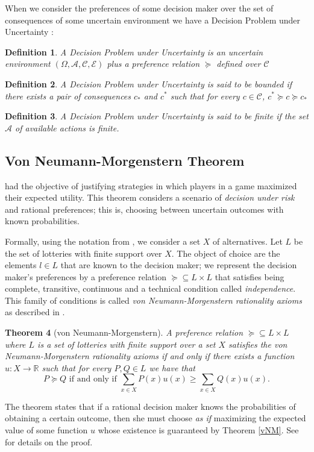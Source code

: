 \documentclass[review]{elsarticle}
\newtheorem{theorem}{Theorem}
\newtheorem{definition}[theorem]{Definition}
\begin{document}
When we consider the preferences of some decision maker over the set of consequences of some uncertain environment we have a Decision Problem under Uncertainty \citep{bernardo2000bayesian}:

\begin{definition}
A Decision Problem under Uncertainty is an uncertain environment $(\Omega, \mathcal{A},\mathcal{C},\mathcal{E})$ plus a preference relation $\succeq$ defined over $\mathcal{C}$ 
\end{definition}

\begin{definition}
A Decision Problem under Uncertainty is said to be bounded if there exists a pair of consequences $c_\ast$ and $c^\ast$ such that for every $c \in \mathcal{C}$, $c^{\ast} \succeq c \succeq c_\ast$
\end{definition}

\begin{definition}
A Decision Problem under Uncertainty is said to be finite if the set $\mathcal{A}$ of available actions is finite.
\end{definition}

\subsection{Von Neumann-Morgenstern Theorem}
\label{vNM-M}
\cite{von1944theory} had the objective of justifying strategies in which players in a game maximized their expected utility. This theorem considers a scenario of \textit{decision under risk} and rational preferences; this is, choosing between uncertain outcomes with known probabilities. 

Formally, using the notation from \cite{gilboa2009decision}, we consider a set $X$ of alternatives. Let $L$ be the set of lotteries with finite support over $X$. The object of choice are the elements $l \in L$ that are known to the decision maker; we represent the decision maker's preferences by a preference relation $\succeq \subseteq L \times L$ that  satisfies being complete, transitive, continuous and a technical condition called \textit{independence}. This family of conditions is called \textit{von Neumann-Morgenstern rationality axioms} as described in \cite{gilboa2009decision}.

\begin{theorem}[von Neumann-Morgenstern]{\label{vNM}}
A preference relation $\succeq \subseteq L \times L$ where $L$ is a set of lotteries with finite support over a set $X$ satisfies the von Neumann-Morgenstern rationality axioms if and only if there exists a function $u: X \to \mathbb{R}$ such that for every $P, Q \in L$ we have that
\begin{equation}
P \succeq Q \textrm{ if and only if } \sum_{x \in X} P(x) u(x) \geq \sum_{x \in X} Q(x) u(x). 
\end{equation}
\end{theorem}
The theorem states that if a rational decision maker knows the probabilities of obtaining a certain outcome, then she must choose \textit{as if} maximizing the expected value of some function $u$ whose existence is guaranteed by Theorem \ref{vNM}. See \cite{gilboa2009decision} for details on the proof.
\end{document}
